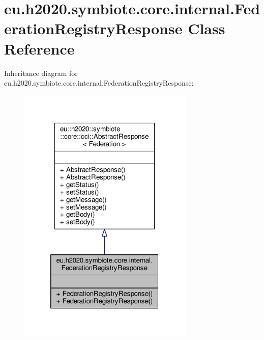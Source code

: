 \hypertarget{classeu_1_1h2020_1_1symbiote_1_1core_1_1internal_1_1FederationRegistryResponse}{}\section{eu.\+h2020.\+symbiote.\+core.\+internal.\+Federation\+Registry\+Response Class Reference}
\label{classeu_1_1h2020_1_1symbiote_1_1core_1_1internal_1_1FederationRegistryResponse}


Inheritance diagram for eu.\+h2020.\+symbiote.\+core.\+internal.\+Federation\+Registry\+Response\+:
\nopagebreak
\begin{figure}[H]
\begin{center}
\leavevmode
\includegraphics[width=236pt]{classeu_1_1h2020_1_1symbiote_1_1core_1_1internal_1_1FederationRegistryResponse__inherit__graph}
\end{center}
\end{figure}


